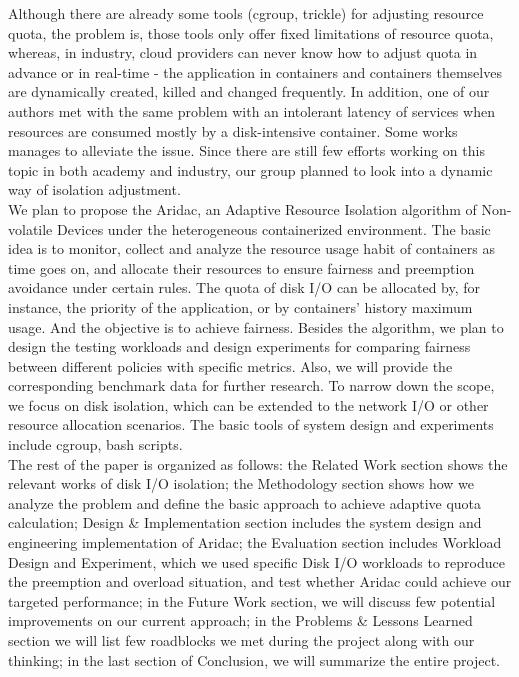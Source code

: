 \documentclass[10pt, conference,compsoc]{IEEEtran}
\begin{document}
Although there are already some tools (cgroup, trickle) for adjusting resource quota, the problem is, those tools only offer fixed limitations of resource quota, whereas, in industry, cloud providers can never know how to adjust quota in advance or in real-time - the application in containers and containers themselves are dynamically created, killed and changed frequently. In addition, one of our authors met with the same problem with an intolerant latency of services when resources are consumed mostly by a disk-intensive container. Some works \cite{Sungyong16} manages to alleviate the issue. Since there are still few efforts working on this topic in both academy and industry, our group planned to look into a dynamic way of isolation adjustment.\\

We plan to propose the Aridac, an Adaptive Resource Isolation algorithm of Non-volatile Devices under the heterogeneous containerized environment. The basic idea is to monitor, collect and analyze the resource usage habit of containers as time goes on, and allocate their resources to ensure fairness and preemption avoidance under certain rules. The quota of disk I/O can be allocated by, for instance, the priority of the application, or by containers' history maximum usage. And the objective is to achieve fairness. Besides the algorithm, we plan to design the testing workloads and design experiments for comparing fairness between different policies with specific metrics. Also, we will provide the corresponding benchmark data for further research. To narrow down the scope, we focus on disk isolation, which can be extended to the network I/O or other resource allocation scenarios. The basic tools of system design and experiments include cgroup, bash scripts.\\

The rest of the paper is organized as follows: the Related Work section shows the relevant works of disk I/O isolation; the Methodology section shows how we analyze the problem and define the basic approach to achieve adaptive quota calculation; Design \& Implementation section includes the system design and engineering implementation of Aridac; the Evaluation section includes Workload Design and Experiment, which we used specific Disk I/O workloads to reproduce the preemption and overload situation, and test whether Aridac could achieve our targeted performance; in the Future Work section, we will discuss few potential improvements on our current approach; in the Problems \& Lessons Learned section we will list few roadblocks we met during the project along with our thinking; in the last section of Conclusion, we will summarize the entire project. \\
\end{document}
